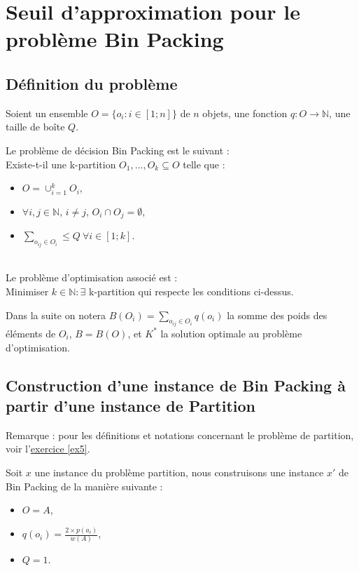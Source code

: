 \section{Seuil d'approximation pour le problème Bin Packing}\label{ex10}

\subsection{Définition du problème}\label{ex10_q1}
Soient un ensemble $O = \{o_i : i \in [1;n]\}$ de $n$ objets, une fonction $q : O \rightarrow \mathbb{N}$, une taille de boîte $Q$.

Le problème de décision Bin Packing est le suivant :\\
Existe-t-il une k-partition $O_1,...,O_k \subseteq O$ telle que :
\begin{itemize}
	\item $O = \cup_{i = 1}^{k}O_i$,
	\item $\forall i,j \in \mathbb{N}$, $i \neq j$, $O_i \cap O_j = \emptyset$,
	\item $\sum_{o_{ij} \in O_i} \leq Q\ \forall i \in [1;k]$.
\end{itemize}
~\\
Le problème d'optimisation associé est :\\
Minimiser $k \in \mathbb{N} : \exists$ k-partition qui respecte les conditions ci-dessus.

Dans la suite on notera $B(O_i) = \sum\limits_{o_{ij} \in O_i}q(o_i)$ la somme des poids des
éléments de $O_i$, $B = B(O)$, et $K^*$ la solution optimale au problème d'optimisation.

\subsection{Construction d'une instance de Bin Packing à partir d'une instance de Partition}\label{ex10_q2}
Remarque : pour les définitions et notations concernant le problème de partition, voir
l'\href{ex5}{exercice \ref{ex5}}.

Soit $x$ une instance du problème partition, nous construisons
une instance $x'$ de Bin Packing de la manière suivante :

\begin{itemize}
	\item $O = A$,
	\item $q(o_i) = \frac{2 \times p(a_i)}{w(A)}$,
	\item $Q = 1$.
\end{itemize}


